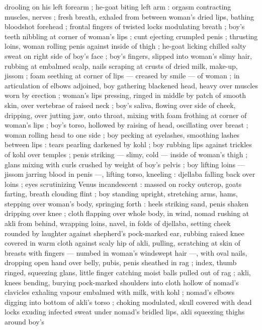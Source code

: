 drooling on his left forearm ; he-goat biting left arm : orgasm 
contracting muscles, nerves ; fresh breath, exhaled from between 
woman's dried lips, bathing bloodshot forehead ; frontal fingers of 
twisted locks modulating breath ; boy's teeth nibbling at corner of 
woman's lips ; cunt ejecting crumpled penis ; thrusting loins, woman 
rolling penis against inside of thigh ; he-goat licking chilled salty 
sweat on right side of boy's face ; boy's fingers, slipped into 
woman's slimy hair, rubbing at embalmed scalp, nails scraping at 
crusts of dried milk, make-up, jissom ; foam seething at corner of 
lips --- creased by smile --- of woman ; in articulation of elbows 
adjoined, boy gathering blackened head, heavy over muscles worn 
by erection ; woman's lips pressing, ringed in middle by patch of 
smooth skin, over vertebrae of raised neck ; boy's saliva, flowing 
over side of cheek, dripping, over jutting jaw, onto throat, mixing with 
foam frothing at corner of woman's lips ; boy's torso, hollowed by 
raising of head, oscillating over breast ; woman rolling head to one 
side ; boy pecking at eyelashes, smoothing lashes between lips : 
tears pearling darkened by kohl ; boy rubbing lips against trickles of 
kohl over temples ; penis striking --- slimy, cold --- inside of 
woman's thigh ; glans mixing with curls crushed by weight of boy's 
pelvis ; boy lifting loins --- jissom jarring blood in penis ---, lifting 
torso, kneeling : djellaba falling back over loins ; eyes scrutinizing 
Venus incandescent : massed on rocky outcrop, goats farting, breath 
clouding flint ; boy standing upright, stretching arms, hams, stepping 
over woman's body, springing forth : heels striking sand, penis 
shaken dripping over knee ; cloth flapping over whole body, in wind, 
nomad rushing at akli from behind, wrapping loins, navel, in folds of 
djellaba, setting cheek rounded by laughter against shepherd's 
pock-marked ear, rubbing raised knee covered in warm cloth against 
scaly hip of akli, pulling, scratching at skin of breasts with fingers --- 
numbed in woman's windswept hair ---, with oval nails, dropping 
open hand over belly, pubis, penis sheathed in rag ; index, thumb 
ringed, squeezing glans, little finger catching moist balls pulled out 
of rag ; akli, knees bending, burying pock-marked shoulders into 
cloth {\col} hollow of nomad's clavicles exhaling vapour embalmed with 
milk, with kohl ; nomad's elbows digging into bottom of akli's torso 
; choking modulated, skull covered with dead locks exuding infected 
sweat under nomad's bridled lips, akli squeezing thighs around boy's 
